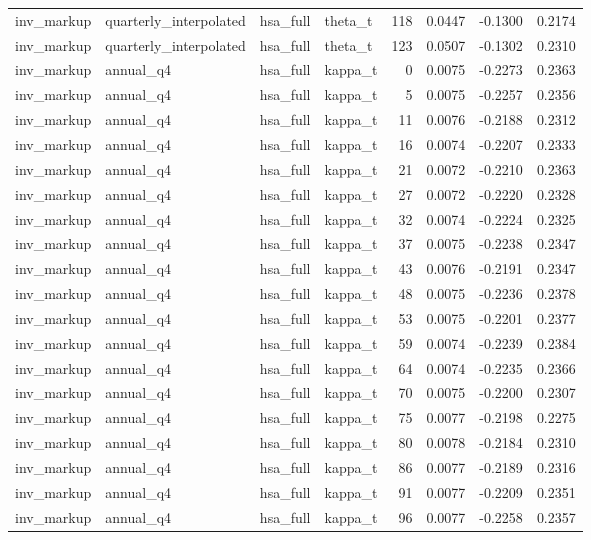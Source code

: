 \begin{tabular}{llllrrrr}
inv\_markup & quarterly\_interpolated & hsa\_full & theta\_t & 118 & 0.0447 & -0.1300 & 0.2174 \\
inv\_markup & quarterly\_interpolated & hsa\_full & theta\_t & 123 & 0.0507 & -0.1302 & 0.2310 \\
inv\_markup & annual\_q4 & hsa\_full & kappa\_t & 0 & 0.0075 & -0.2273 & 0.2363 \\
inv\_markup & annual\_q4 & hsa\_full & kappa\_t & 5 & 0.0075 & -0.2257 & 0.2356 \\
inv\_markup & annual\_q4 & hsa\_full & kappa\_t & 11 & 0.0076 & -0.2188 & 0.2312 \\
inv\_markup & annual\_q4 & hsa\_full & kappa\_t & 16 & 0.0074 & -0.2207 & 0.2333 \\
inv\_markup & annual\_q4 & hsa\_full & kappa\_t & 21 & 0.0072 & -0.2210 & 0.2363 \\
inv\_markup & annual\_q4 & hsa\_full & kappa\_t & 27 & 0.0072 & -0.2220 & 0.2328 \\
inv\_markup & annual\_q4 & hsa\_full & kappa\_t & 32 & 0.0074 & -0.2224 & 0.2325 \\
inv\_markup & annual\_q4 & hsa\_full & kappa\_t & 37 & 0.0075 & -0.2238 & 0.2347 \\
inv\_markup & annual\_q4 & hsa\_full & kappa\_t & 43 & 0.0076 & -0.2191 & 0.2347 \\
inv\_markup & annual\_q4 & hsa\_full & kappa\_t & 48 & 0.0075 & -0.2236 & 0.2378 \\
inv\_markup & annual\_q4 & hsa\_full & kappa\_t & 53 & 0.0075 & -0.2201 & 0.2377 \\
inv\_markup & annual\_q4 & hsa\_full & kappa\_t & 59 & 0.0074 & -0.2239 & 0.2384 \\
inv\_markup & annual\_q4 & hsa\_full & kappa\_t & 64 & 0.0074 & -0.2235 & 0.2366 \\
inv\_markup & annual\_q4 & hsa\_full & kappa\_t & 70 & 0.0075 & -0.2200 & 0.2307 \\
inv\_markup & annual\_q4 & hsa\_full & kappa\_t & 75 & 0.0077 & -0.2198 & 0.2275 \\
inv\_markup & annual\_q4 & hsa\_full & kappa\_t & 80 & 0.0078 & -0.2184 & 0.2310 \\
inv\_markup & annual\_q4 & hsa\_full & kappa\_t & 86 & 0.0077 & -0.2189 & 0.2316 \\
inv\_markup & annual\_q4 & hsa\_full & kappa\_t & 91 & 0.0077 & -0.2209 & 0.2351 \\
inv\_markup & annual\_q4 & hsa\_full & kappa\_t & 96 & 0.0077 & -0.2258 & 0.2357 \\

\end{tabular}
